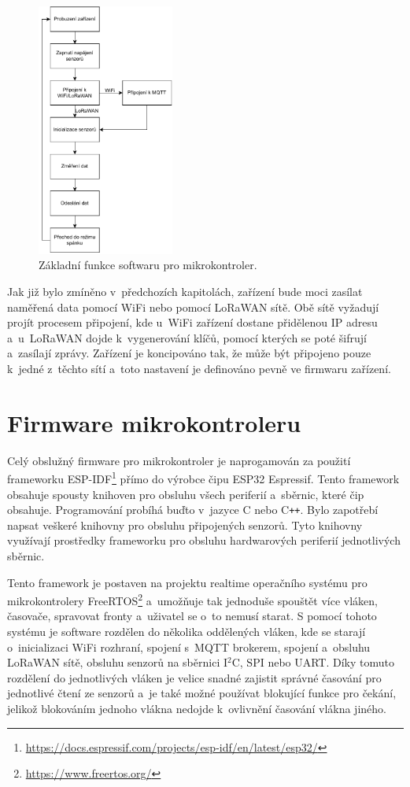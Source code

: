 \begin{figure}[h]
    \centering
    \includegraphics[width=0.4\textwidth]{obrazky/flowchart.pdf}
    \caption{Základní funkce softwaru pro mikrokontroler.}
    \label{fig_flowchart}
\end{figure}

Jak již bylo zmíněno v~předchozích kapitolách, zařízení bude moci zasílat naměřená data pomocí WiFi nebo pomocí LoRaWAN sítě. Obě sítě vyžadují projít procesem připojení, kde u~WiFi zařízení dostane přidělenou IP adresu a~u~LoRaWAN dojde k~vygenerování klíčů, pomocí kterých se poté šifrují a~zasílají zprávy. Zařízení je koncipováno tak, že může být připojeno pouze k~jedné z~těchto sítí a~toto nastavení je definováno pevně ve firmwaru zařízení. 

\section{Firmware mikrokontroleru}

Celý obslužný firmware pro mikrokontroler je naprogamován za použití frameworku ESP-IDF\footnote{\url{https://docs.espressif.com/projects/esp-idf/en/latest/esp32/}} přímo do výrobce čipu ESP32 Espressif. Tento framework obsahuje spou\-sty knihoven pro obsluhu všech periferií a~sběrnic, které čip obsahuje. Programování probíhá buďto v~jazyce C nebo C\texttt{++}. Bylo zapotřebí napsat veškeré knihovny pro obsluhu připojených senzorů. Tyto knihovny využívají prostředky frameworku pro obsluhu hardwarových periferií jednotlivých sběrnic.

Tento framework je postaven na projektu realtime operačního systému pro mikrokontrolery FreeRTOS\footnote{\url{https://www.freertos.org/}} a~umožňuje tak jednoduše spouštět více vláken, časovače, spravovat fronty a~uživatel se o~to nemusí starat. S pomocí tohoto systému je software rozdělen do několika oddělených vláken, kde se starají o~inicializaci WiFi rozhraní, spojení s~MQTT brokerem, spojení a~obsluhu LoRaWAN sítě, obsluhu senzorů na sběrnici I$^2$C, SPI nebo UART. Díky tomuto rozdělení do jednotlivých vláken je velice snadné zajistit správné časování pro jednotlivé čtení ze senzorů a~je také možné používat blokující funkce pro čekání, jelikož blokováním jednoho vlákna nedojde k~ovlivnění časování vlákna jiného.

